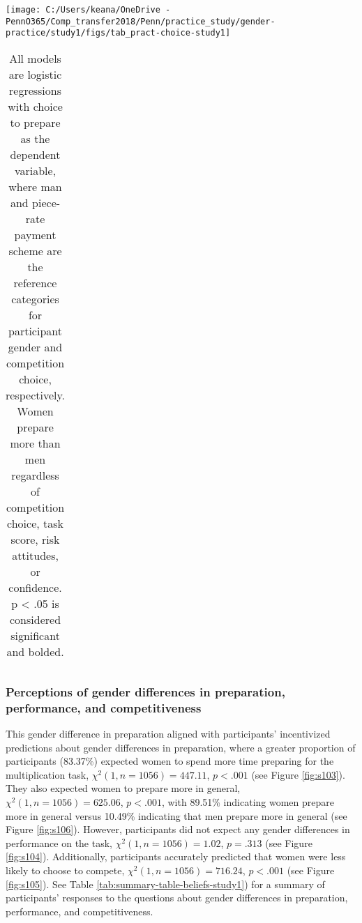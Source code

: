 \documentclass[letterpaper, nobind]{templates/ociamthesis}
\begin{document}
\begin{center}\texttt{[image: C:/Users/keana/OneDrive - PennO365/Comp\_transfer2018/Penn/practice\_study/gender-practice/study1/figs/tab\_pract-choice-study1]} \end{center}

\begin{table}[ht]
\centering
\begingroup\fontsize{0.1pt}{0.1pt}\selectfont
\begin{tabular}{r}
   \\ 
 \end{tabular}
\endgroup
\caption{All models are logistic regressions with choice to prepare as the dependent variable, where man and piece-rate payment scheme are the reference categories for participant gender and competition choice, respectively. Women prepare more than men regardless of competition choice, task score, risk attitudes, or confidence. p < .05 is considered significant and bolded.} 
\label{tab:tab-pract-choice-study1}
\end{table}

\hypertarget{perceptions-of-gender-differences-in-preparation-performance-and-competitiveness}{%
\subsubsection{Perceptions of gender differences in preparation, performance, and competitiveness}\label{perceptions-of-gender-differences-in-preparation-performance-and-competitiveness}}

This gender difference in preparation aligned with participants' incentivized predictions about gender differences in preparation, where a greater proportion of participants (83.37\%) expected women to spend more time preparing for the multiplication task, \(\chi^2(1, n = 1056) = 447.11\), \(p < .001\) (see Figure \ref{fig:s103}). They also expected women to prepare more in general, \(\chi^2(1, n = 1056) = 625.06\), \(p < .001\), with 89.51\% indicating women prepare more in general versus 10.49\% indicating that men prepare more in general (see Figure \ref{fig:s106}). However, participants did not expect any gender differences in performance on the task, \(\chi^2(1, n = 1056) = 1.02\), \(p = .313\) (see Figure \ref{fig:s104}). Additionally, participants accurately predicted that women were less likely to choose to compete, \(\chi^2(1, n = 1056) = 716.24\), \(p < .001\) (see Figure \ref{fig:s105}). See Table \ref{tab:summary-table-beliefs-study1}) for a summary of participants' responses to the questions about gender differences in preparation, performance, and competitiveness.
\end{document}
